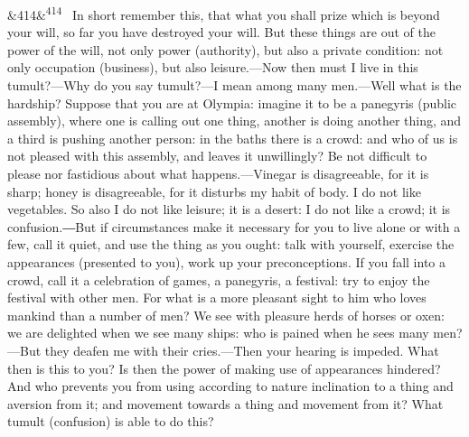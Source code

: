 \documentclass[12pt]{article}
\newcommand{\para}[1][]{\par\noindent\ifx&#1&\else\textsuperscript{\footnotesize #1}~\fi}
\begin{document}
\para[414] In short remember this, that what you shall prize which is beyond your will, so far you have destroyed your will. But these things are out of the power of the will, not only power (authority), but also a private condition: not only occupation (business), but also leisure.—Now then must I live in this tumult?—Why do you say tumult?—I mean among many men.—Well what is the hardship? Suppose that you are at Olympia: imagine it to be a panegyris (public assembly), where one is calling out one thing, another is doing another thing, and a third is pushing another person: in the baths there is a crowd: and who of us is not pleased with this assembly, and leaves it unwillingly? Be not difficult to please nor fastidious about what happens.—Vinegar is disagreeable, for it is sharp; honey is disagreeable, for it disturbs my habit of body. I do not like vegetables. So also I do not like leisure; it is a desert: I do not like a crowd; it is confusion.―But if circumstances make it necessary for you to live alone or with a few, call it quiet, and use the thing as you ought: talk with yourself, exercise the appearances (presented to you), work up your preconceptions. If you fall into a crowd, call it a celebration of games, a panegyris, a festival: try to enjoy the festival with other men. For what is a more pleasant sight to him who loves mankind than a number of men? We see with pleasure herds of horses or oxen: we are delighted when we see many ships: who is pained when he sees many men?—But they deafen me with their cries.—Then your hearing is impeded. What then is this to you? Is then the power of making use of appearances hindered? And who prevents you from using according to nature inclination to a thing and aversion from it; and movement towards a thing and movement from it? What tumult (confusion) is able to do this?
\end{document}
